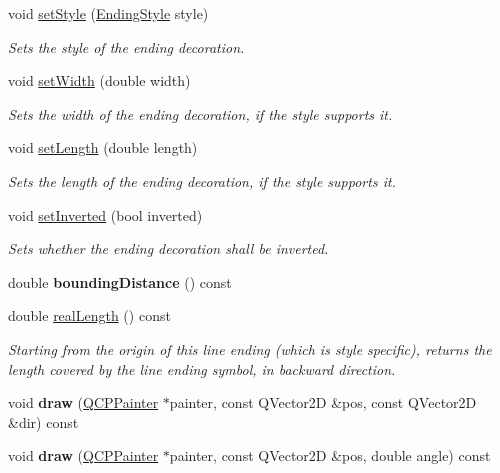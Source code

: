 \begin{DoxyCompactItemize}
\item 
\hypertarget{classQCPLineEnding_a56953b9cb8ed1bed0f025c3935f16910}{}void \hyperlink{classQCPLineEnding_a56953b9cb8ed1bed0f025c3935f16910}{set\+Style} (\hyperlink{classQCPLineEnding_a5ef16e6876b4b74959c7261d8d4c2cd5}{Ending\+Style} style)\label{classQCPLineEnding_a56953b9cb8ed1bed0f025c3935f16910}

\begin{DoxyCompactList}\small\item\em Sets the style of the ending decoration. \end{DoxyCompactList}\item 
void \hyperlink{classQCPLineEnding_a26dc020ea985a72cc25881ce2115e34e}{set\+Width} (double width)
\begin{DoxyCompactList}\small\item\em Sets the width of the ending decoration, if the style supports it. \end{DoxyCompactList}\item 
void \hyperlink{classQCPLineEnding_ae36fa01763751cd64b7f56c3507e935a}{set\+Length} (double length)
\begin{DoxyCompactList}\small\item\em Sets the length of the ending decoration, if the style supports it. \end{DoxyCompactList}\item 
void \hyperlink{classQCPLineEnding_a580e4e2360b35ebb8d68f3494aa2335d}{set\+Inverted} (bool inverted)
\begin{DoxyCompactList}\small\item\em Sets whether the ending decoration shall be inverted. \end{DoxyCompactList}\item 
\hypertarget{classQCPLineEnding_a586b45cf738881a70119e353dc1ed59c}{}double {\bfseries bounding\+Distance} () const \label{classQCPLineEnding_a586b45cf738881a70119e353dc1ed59c}

\item 
double \hyperlink{classQCPLineEnding_a6a528e6dc5aabe1077a573b045715f03}{real\+Length} () const 
\begin{DoxyCompactList}\small\item\em Starting from the origin of this line ending (which is style specific), returns the length covered by the line ending symbol, in backward direction. \end{DoxyCompactList}\item 
\hypertarget{classQCPLineEnding_ac4b2fa94bd27b2f008b5fc090fcd7c0b}{}void {\bfseries draw} (\hyperlink{classQCPPainter}{Q\+C\+P\+Painter} $\ast$painter, const Q\+Vector2\+D \&pos, const Q\+Vector2\+D \&dir) const \label{classQCPLineEnding_ac4b2fa94bd27b2f008b5fc090fcd7c0b}

\item 
\hypertarget{classQCPLineEnding_a05c143b1f66cb68d746c309523c45e3e}{}void {\bfseries draw} (\hyperlink{classQCPPainter}{Q\+C\+P\+Painter} $\ast$painter, const Q\+Vector2\+D \&pos, double angle) const \label{classQCPLineEnding_a05c143b1f66cb68d746c309523c45e3e}

\end{DoxyCompactItemize}
